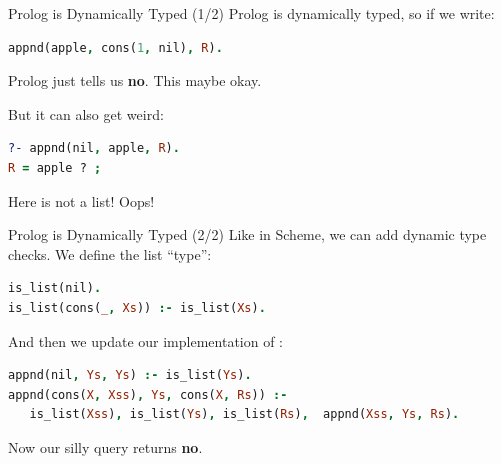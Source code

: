 \begin{frame}[fragile]{Prolog is Dynamically Typed (1/2)}
Prolog is dynamically typed, so if we write:

\begin{lstlisting}[language=prolog, xleftmargin=0.5cm]
appnd(apple, cons(1, nil), R).
\end{lstlisting}

Prolog just tells us \textbf{no}. This maybe okay.

\pause

But it can also get weird:

\begin{lstlisting}[language=prolog, xleftmargin=0.5cm]
?- appnd(nil, apple, R).
R = apple ? ;
\end{lstlisting}

Here  is not a list! Oops!
\end{frame}
    
\begin{frame}[fragile]{Prolog is Dynamically Typed (2/2)}
Like in Scheme, we can add dynamic type checks. We define the list ``type'':

\begin{lstlisting}[language=prolog, xleftmargin=0.5cm]
is_list(nil).
is_list(cons(_, Xs)) :- is_list(Xs).
\end{lstlisting}

\pause

And then we update our implementation of :

\begin{lstlisting}[language=prolog, xleftmargin=0.5cm]
appnd(nil, Ys, Ys) :- is_list(Ys).
appnd(cons(X, Xss), Ys, cons(X, Rs)) :- 
   is_list(Xss), is_list(Ys), is_list(Rs),  appnd(Xss, Ys, Rs).
\end{lstlisting}

Now our silly query  returns \textbf{no}.
\end{frame}

